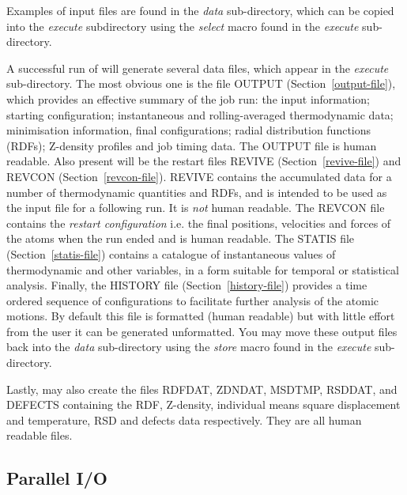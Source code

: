 Examples of input files are found in the {\em data} sub-directory,
which can be copied into the {\em execute} subdirectory using the {\sl
select} macro found in the {\em execute} sub-directory.

A successful run of \D will generate several data files, which
appear in the {\em execute} sub-directory.  The most obvious one
is the file OUTPUT (Section~\ref{output-file}), which provides an
effective summary of the job run: the input information; starting
configuration; instantaneous and rolling-averaged thermodynamic
data; minimisation information, final configurations;
radial distribution functions (RDFs); Z-density profiles
and job timing data.  The OUTPUT file is human readable.  Also
present will be the restart files REVIVE (Section~\ref{revive-file})
and REVCON (Section~\ref{revcon-file}).  REVIVE
contains the accumulated data for a number of thermodynamic
quantities and RDFs, and is intended to be used as the input file
for a following run.  It is {\em not} human readable.  The REVCON
file contains the {\em restart configuration} i.e. the final
positions, velocities and forces of the atoms when the run ended
and is human readable.  The STATIS file (Section~\ref{statis-file})
contains a catalogue of instantaneous values of thermodynamic and
other variables, in a form suitable for temporal or statistical
analysis.  Finally, the HISTORY file (Section~\ref{history-file})
provides a time ordered sequence of configurations to facilitate
further analysis of the atomic motions.  By default this file is
formatted (human readable) but with little effort from the user
it can be generated unformatted.  You may move these output files
back into the {\em data} sub-directory using the {\sl store} macro
found in the {\em execute} sub-directory.

Lastly, \D may also create the files RDFDAT, ZDNDAT, MSDTMP, RSDDAT,
and DEFECTS containing the RDF, Z-density, individual means square
displacement and temperature, RSD and defects data respectively.  They
are all human readable files.

\subsection{Parallel I/O}

